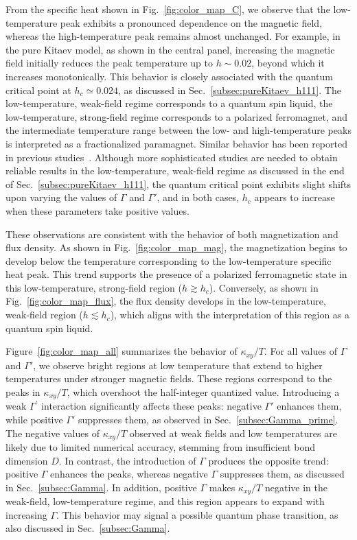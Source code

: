 \documentclass[twocolumn,superscriptaddress,showpacs, longbibliography, aps, prx]{revtex4-2}
\begin{document}
From the specific heat shown in Fig.~\ref{fig:color_map_C}, we observe that the low-temperature peak exhibits a pronounced dependence on the magnetic field, whereas the high-temperature peak remains almost unchanged. For example, in the pure Kitaev model, as shown in the central panel, increasing the magnetic field initially reduces the peak temperature up to $h \sim 0.02$, beyond which it increases monotonically. This behavior is closely associated with the quantum critical point at $h_c \simeq 0.024$, as discussed in Sec.~\ref{subsec:pureKitaev_h111}. 
The low-temperature, weak-field regime corresponds to a quantum spin liquid, the low-temperature, strong-field regime corresponds to a polarized ferromagnet, and the intermediate temperature range between the low- and high-temperature peaks is interpreted as a fractionalized paramagnet. Similar behavior has been reported in previous studies~\cite{YoshitakeNKM2020,Li2020,LiLXGQLS2024}.
Although more sophisticated studies are needed to obtain reliable results in the low-temperature, weak-field regime as discussed in the end of Sec.~\ref{subsec:pureKitaev_h111}, the quantum critical point exhibits slight shifts upon varying the values of $\Gamma$ and $\Gamma'$, and in both cases, $h_c$ appears to increase when these parameters take positive values. 

These observations are consistent with the behavior of both magnetization and flux density. 
As shown in Fig.~\ref{fig:color_map_mag}, the magnetization begins to develop below the temperature corresponding to the low-temperature specific heat peak. 
This trend supports the presence of a polarized ferromagnetic state in this low-temperature, strong-field region ($h \gtrsim h_c$). 
Conversely, as shown in Fig.~\ref{fig:color_map_flux}, the flux density develops in the low-temperature, weak-field region ($h \lesssim h_c$), which aligns with the interpretation of this region as a quantum spin liquid.

Figure~\ref{fig:color_map_all} summarizes the behavior of $\kappa_{xy}/T$. 
For all values of $\Gamma$ and $\Gamma'$, we observe bright regions at low temperature that extend to higher temperatures under stronger magnetic fields. 
These regions correspond to the peaks in $\kappa_{xy}/T$, which overshoot the half-integer quantized value. 
Introducing a weak $\Gamma^{\prime}$ interaction significantly affects these peaks: 
negative $\Gamma'$ enhances them, while positive $\Gamma'$ suppresses them, as observed in Sec.~\ref{subsec:Gamma_prime}. 
The negative values of $\kappa_{xy}/T$ observed at weak fields and low temperatures are likely due to limited numerical accuracy, stemming from insufficient bond dimension $D$. 
In contrast, the introduction of $\Gamma$ produces the opposite trend:
positive $\Gamma$ enhances the peaks, whereas negative $\Gamma$ suppresses them, as discussed in Sec.~\ref{subsec:Gamma}.
In addition, positive $\Gamma$ makes $\kappa_{xy}/T$ negative in the weak-field, low-temperature regime, and this region appears to expand with increasing $\Gamma$. 
This behavior may signal a possible quantum phase transition, as also discussed in Sec.~\ref{subsec:Gamma}. 
\end{document}
